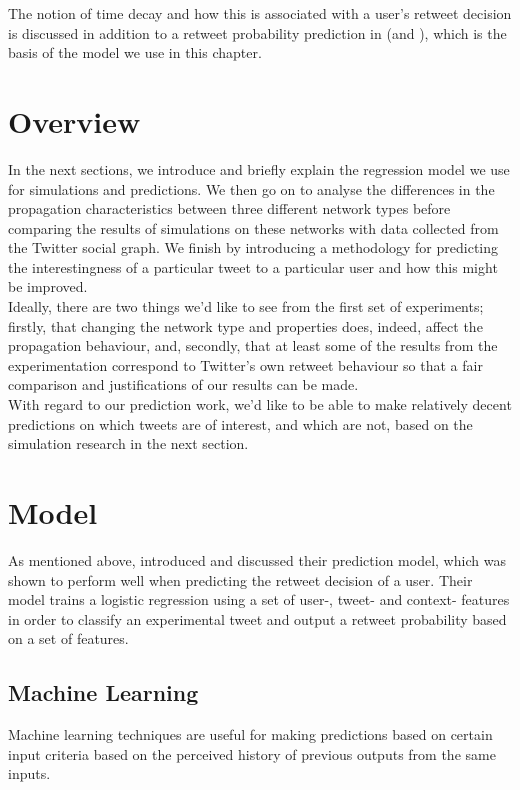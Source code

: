 The notion of time decay and how this is associated with a user's retweet decision is discussed in addition to a retweet probability prediction in \cite{zhu11} (and \cite{peng11}), which is the basis of the model we use in this chapter.

\section{Overview}
In the next sections, we introduce and briefly explain the regression model we use for simulations and predictions. We then go on to analyse the differences in the propagation characteristics between three different network types before comparing the results of simulations on these networks with data collected from the Twitter social graph. We finish by introducing a methodology for predicting the interestingness of a particular tweet to a particular user and how this might be improved.
\\
Ideally, there are two things we'd like to see from the first set of experiments; firstly, that changing the network type and properties does, indeed, affect the propagation behaviour, and, secondly, that at least some of the results from the experimentation correspond to Twitter's own retweet behaviour so that a fair comparison and justifications of our results can be made.
\\
With regard to our prediction work, we'd like to be able to make relatively decent predictions on which tweets are of interest, and which are not, based on the simulation research in the next section.

\section{Model} 
As mentioned above, \cite{zhu11} introduced and discussed their prediction model, which was shown to perform well when predicting the retweet decision of a user. Their model trains a logistic regression using a set of user-, tweet- and context- features in order to classify an experimental tweet and output a retweet probability based on a set of features.

\subsection{Machine Learning}
Machine learning techniques are useful for making predictions based on certain input criteria based on the perceived history of previous outputs from the same inputs. 

